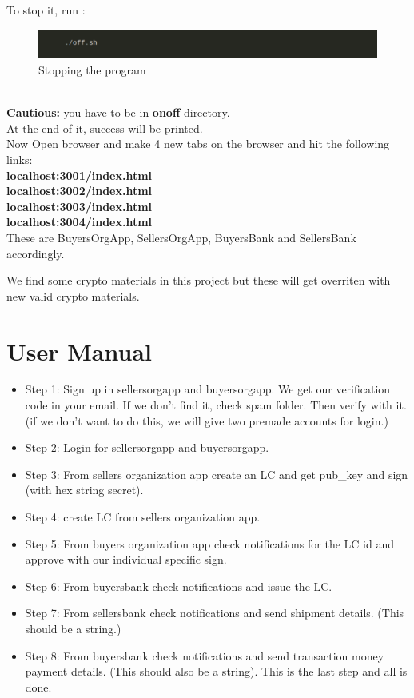 \documentclass[a4paper,12pt]{report}
\begin{document}
\newpage
To stop it, run : 
\begin{figure}[h]
    \centering
    \includegraphics[width=0.7\paperwidth]{offCapture.pdf}
    \caption{Stopping the program}
    \label{fig:off}
\end{figure}
\\\textbf{Cautious:} you have to be in \textbf{onoff} directory.\\
At the end of it, success will be printed.\\
Now Open browser and make 4 new tabs on the browser and hit the following links:\\
\textbf{localhost:3001/index.html}\\
\textbf{localhost:3002/index.html}\\
\textbf{localhost:3003/index.html}\\
\textbf{localhost:3004/index.html}\\
These are BuyersOrgApp, SellersOrgApp, BuyersBank and SellersBank accordingly.

\vspace{20pt}
We find some crypto materials in this project but these will get overriten with new valid crypto materials. 

\section{User Manual}
\begin{itemize}
\item {\color{cyan}Step 1:} Sign up in sellersorgapp and buyersorgapp. We get our verification code in your email. If we don't find it, check spam folder. Then verify with it. (if we don't want to do this, we will give two premade accounts for login.)
\item {\color{cyan}Step 2:}  Login for sellersorgapp and buyersorgapp.
\item {\color{cyan}Step 3:} From sellers organization app create an LC and get pub\_key and sign (with hex string secret).
\item {\color{cyan}Step 4:} create LC from sellers organization app.
\item {\color{cyan}Step 5:} From buyers organization app check notifications for the LC id and approve with our individual specific sign.
\item {\color{cyan}Step 6:} From buyersbank check notifications and issue the LC.
\item {\color{cyan}Step 7:} From sellersbank check notifications and send shipment details. (This should be a string.)
\item {\color{cyan}Step 8:}  From buyersbank check notifications and send transaction money payment details. (This should also be a string). This is the last step and all is done.

\end{itemize}
\end{document}
